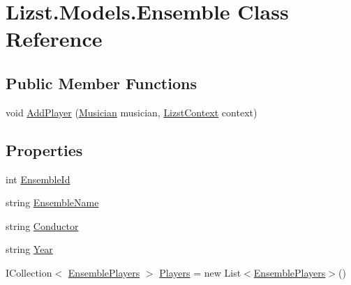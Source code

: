 \hypertarget{class_lizst_1_1_models_1_1_ensemble}{}\section{Lizst.\+Models.\+Ensemble Class Reference}
\label{class_lizst_1_1_models_1_1_ensemble}
\subsection*{Public Member Functions}
\begin{DoxyCompactItemize}
\item 
void \mbox{\hyperlink{class_lizst_1_1_models_1_1_ensemble_a0e6ec27168afe70f00def6fceb282aad}{Add\+Player}} (\mbox{\hyperlink{class_lizst_1_1_models_1_1_musician}{Musician}} musician, \mbox{\hyperlink{class_lizst_1_1_models_1_1_lizst_context}{Lizst\+Context}} context)
\end{DoxyCompactItemize}
\subsection*{Properties}
\begin{DoxyCompactItemize}
\item 
int \mbox{\hyperlink{class_lizst_1_1_models_1_1_ensemble_a04360059951098047a8ed581b5ce207c}{Ensemble\+Id}}
\item 
string \mbox{\hyperlink{class_lizst_1_1_models_1_1_ensemble_a87bb4aabfbdec64b7bb1b684e25ce3d5}{Ensemble\+Name}}
\item 
string \mbox{\hyperlink{class_lizst_1_1_models_1_1_ensemble_ab7dfed7fc5419e80422ad06d0abae147}{Conductor}}
\item 
string \mbox{\hyperlink{class_lizst_1_1_models_1_1_ensemble_a77a9bfd6009a86301ee4ff1d42435462}{Year}}
\item 
I\+Collection$<$ \mbox{\hyperlink{class_lizst_1_1_models_1_1_ensemble_players}{Ensemble\+Players}} $>$ \mbox{\hyperlink{class_lizst_1_1_models_1_1_ensemble_a261f4424029a9a3219471268394ca579}{Players}} = new List$<$\mbox{\hyperlink{class_lizst_1_1_models_1_1_ensemble_players}{Ensemble\+Players}}$>$()
\end{DoxyCompactItemize}


